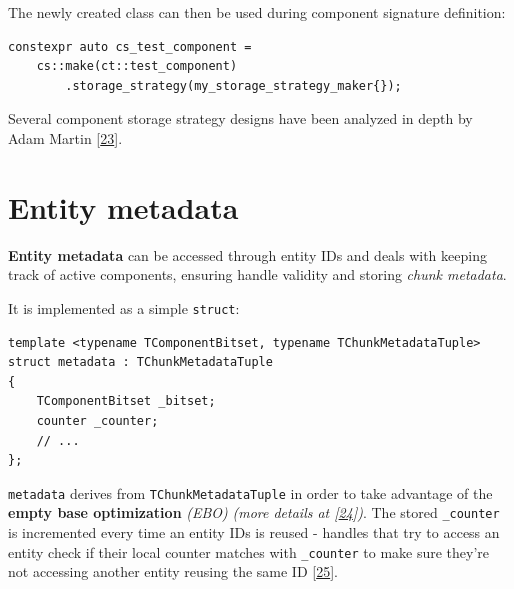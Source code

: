 \documentclass[twoside, 12pt, a4paper, openright]{book}
\begin{document}
The newly created class can then be used during component signature
definition:

\begin{verbatim}
constexpr auto cs_test_component =
    cs::make(ct::test_component)
        .storage_strategy(my_storage_strategy_maker{});
\end{verbatim}

Several component storage strategy designs have been analyzed in depth
by Adam Martin {[}\protect\hyperlink{ref-tmachine_compstorage}{23}{]}.

\hypertarget{storage_entity}{\section{Entity
metadata}\label{storage_entity}}

\textbf{Entity metadata} can be accessed through entity IDs and deals
with keeping track of active components, ensuring handle validity and
storing \emph{chunk metadata}.

It is implemented as a simple
\texttt{struct}:

\begin{verbatim}
template <typename TComponentBitset, typename TChunkMetadataTuple>
struct metadata : TChunkMetadataTuple
{
    TComponentBitset _bitset;
    counter _counter;
    // ...
};
\end{verbatim}

\texttt{metadata}
derives from
\texttt{TChunkMetadataTuple}
in order to take advantage of the \textbf{empty base optimization}
\emph{(EBO)} \emph{(more details at
{[}\protect\hyperlink{ref-cppreference_ebo}{24}{]})}. The stored
\texttt{_counter}
is incremented every time an entity IDs is reused - handles that try to
access an entity check if their local counter matches with
\texttt{_counter}
to make sure they're not accessing another entity reusing the same ID
{[}\protect\hyperlink{ref-tmachine_eids}{25}{]}.
\end{document}
